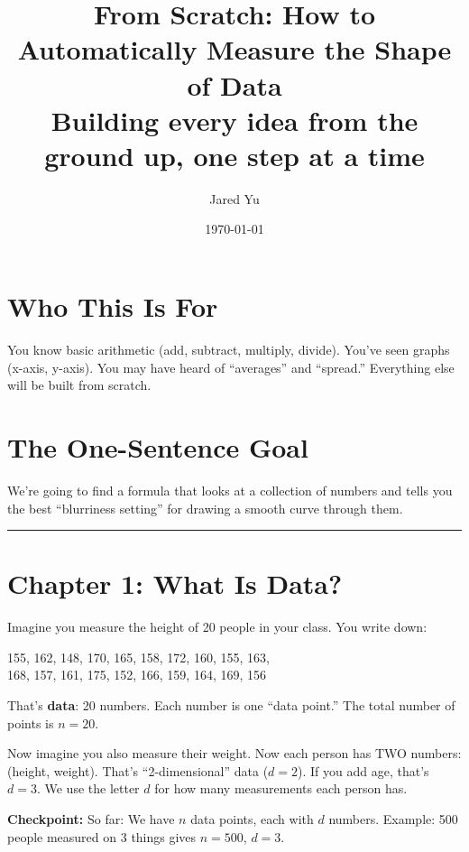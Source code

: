 \documentclass[12pt]{article}
\title{From Scratch: How to Automatically Measure the Shape of Data\\[0.5em]\large Building every idea from the ground up, one step at a time}
\author{Jared Yu}
\date{\today}
\newcommand{\concept}[2]{\begin{tcolorbox}[colback=blue!3,colframe=blue!40!black,title={#1},breakable]#2\end{tcolorbox}}
\newcommand{\checkpoint}[1]{\begin{tcolorbox}[colback=purple!5,colframe=purple!50!black,breakable]\textbf{Checkpoint:} #1\end{tcolorbox}}
\begin{document}
\maketitle

\section*{Who This Is For}

You know basic arithmetic (add, subtract, multiply, divide). You've seen graphs (x-axis, y-axis). You may have heard of ``averages'' and ``spread.'' Everything else will be built from scratch.

\section*{The One-Sentence Goal}

We're going to find a formula that looks at a collection of numbers and tells you the best ``blurriness setting'' for drawing a smooth curve through them.

\bigskip\hrule\bigskip

\section{Chapter 1: What Is Data?}

\concept{Data = a list of measurements}{
Imagine you measure the height of 20 people in your class. You write down:

\begin{center}
155, 162, 148, 170, 165, 158, 172, 160, 155, 163,\\
168, 157, 161, 175, 152, 166, 159, 164, 169, 156
\end{center}

That's \textbf{data}: 20 numbers. Each number is one ``data point.'' The total number of points is $n = 20$.
}

Now imagine you also measure their weight. Now each person has TWO numbers: (height, weight). That's ``2-dimensional'' data ($d = 2$). If you add age, that's $d = 3$. We use the letter $d$ for how many measurements each person has.

\checkpoint{So far: We have $n$ data points, each with $d$ numbers. Example: 500 people measured on 3 things gives $n=500$, $d=3$.}

\end{document}
